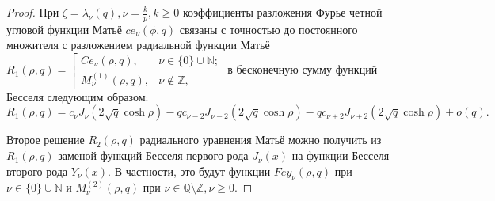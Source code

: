 \begin{proof}
При $\zeta = \lambda_\nu(q), \nu = \frac{k}{p}, k \geq 0$ коэффициенты разложения Фурье четной угловой функции Матьё $ce_\nu(\phi, q)$ связаны \cite{wref2} с точностью до постоянного множителя с разложением радиальной функции Матьё $R_1(\rho, q) = \left[
\begin{array}{ll}
    Ce_\nu(\rho, q),     & \nu \in \{0\} \cup \mathbb{N};  \\
    M_\nu^{(1)}(\rho, q), & \nu \notin \mathbb{Z},
\end{array}
\right.$ в бесконечную сумму функций Бесселя следующим образом:
$$ R_1(\rho, q) = 
	c_\nu J_\nu(2\sqrt{q}\cosh{\rho}) - 
	q c_{\nu-2} J_{\nu-2}(2\sqrt{q}\cosh{\rho}) -
	q c_{\nu+2} J_{\nu+2}(2\sqrt{q}\cosh{\rho}) + o(q).$$

Второе решение $R_2(\rho, q)$  радиального уравнения Матьё можно получить из $R_1(\rho, q)$ заменой функций Бесселя первого рода $J_\nu(x)$ на функции Бесселя второго рода $Y_\nu(x)$. В частности, это будут функции $Fey_\nu(\rho, q)$ при $\nu \in \{0\} \cup \mathbb{N}$ и $M_\nu^{(2)}(\rho, q)$ при $\nu \in \mathbb{Q} \setminus \mathbb{Z}, \nu \ge 0$.


\end{proof}
